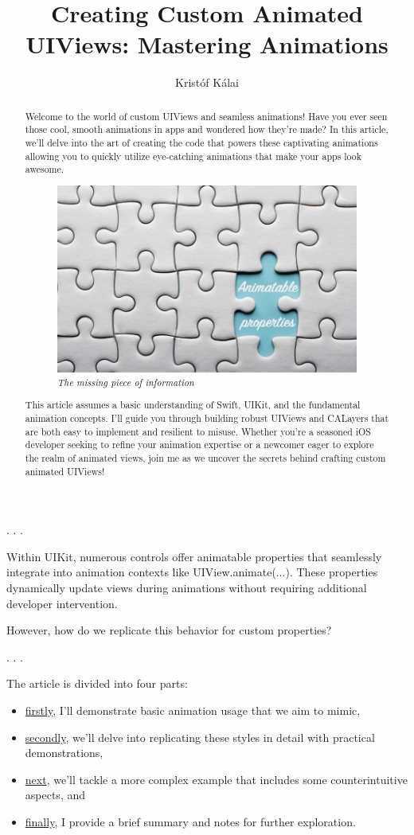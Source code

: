 \documentclass{article}
\title{Creating Custom Animated UIViews: Mastering Animations}
\author{Kristóf Kálai}
\newcommand{\separator}{\vspace{5mm}\centerline{. . .}\vspace{5mm}}
\begin{document}
\maketitle

\renewcommand{\abstractname}{\vspace{-\baselineskip}}
\begin{abstract}
Welcome to the world of custom UIViews and seamless animations! Have you ever seen those cool, smooth animations in apps and wondered how they're made? In this article, we'll delve into the art of creating the code that powers these captivating animations allowing you to quickly utilize eye-catching animations that make your apps look awesome.

\begin{figure}[h]
\centering
\includegraphics[width=0.5\linewidth]{puzzle.jpg}
\caption{\emph{The missing piece of information}}
\end{figure}

This article assumes a basic understanding of Swift, UIKit, and the fundamental animation concepts. I'll guide you through building robust UIViews and CALayers that are both easy to implement and resilient to misuse. Whether you're a seasoned iOS developer seeking to refine your animation expertise or a newcomer eager to explore the realm of animated views, join me as we uncover the secrets behind crafting custom animated UIViews!
\end{abstract}

\separator

Within UIKit, numerous controls offer animatable properties that seamlessly integrate into animation contexts like UIView.animate(...). These properties dynamically update views during animations without requiring additional developer intervention.

However, how do we replicate this behavior for custom properties? 

\separator

The article is divided into four parts:

\begin{itemize}
  \item \hyperref[sec:part1]{firstly}, I'll demonstrate basic animation usage that we aim to mimic,
  \item \hyperref[sec:part2]{secondly}, we'll delve into replicating these styles in detail with practical demonstrations,
  \item \hyperref[sec:part3]{next}, we'll tackle a more complex example that includes some counterintuitive aspects, and
  \item \hyperref[sec:part4]{finally}, I provide a brief summary and notes for further exploration.
\end{itemize}
\end{document}
